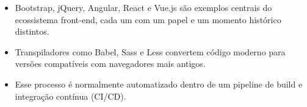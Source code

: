 \begin{itemize}
  \item Bootstrap, jQuery, Angular, React e Vue.js são exemplos centrais do ecossistema front-end, cada um com um papel e um momento histórico distintos.
\end{itemize}

\begin{itemize}
  \item Transpiladores como Babel, Sass e Less convertem código moderno para versões compatíveis com navegadores mais antigos.
\end{itemize}

\begin{itemize}
  \item Esse processo é normalmente automatizado dentro de um pipeline de build e integração contínua (CI/CD).
\end{itemize}
